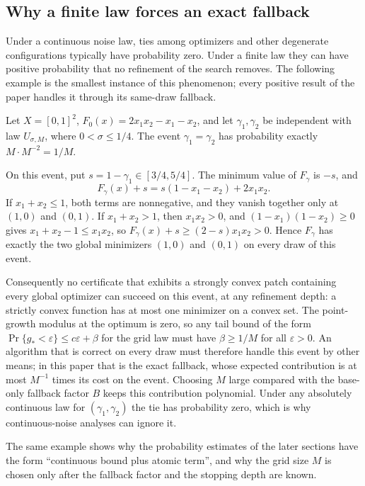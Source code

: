 \subsection{Why a finite law forces an exact fallback}\label{sec:model:atom}

Under a continuous noise law, ties among optimizers and other degenerate
configurations typically have probability zero. Under a finite law they can
have positive probability that no refinement of the search removes. The
following example is the smallest instance of this phenomenon; every
positive result of the paper handles it through its same-draw fallback.

\begin{example}\label{ex:model:tie}
Let $X=[0,1]^2$, $F_0(x)=2x_1x_2-x_1-x_2$, and let $\gamma_1,\gamma_2$ be
independent with law $U_{\sigma,M}$, where $0<\sigma\le1/4$. The event
$\gamma_1=\gamma_2$ has probability exactly $M\cdot M^{-2}=1/M$.

On this event, put $s=1-\gamma_1\in[3/4,5/4]$. The minimum value of
$F_\gamma$ is $-s$, and
\[
 F_\gamma(x)+s=s(1-x_1-x_2)+2x_1x_2 .
\]
If $x_1+x_2\le1$, both terms are nonnegative, and they vanish together only
at $(1,0)$ and $(0,1)$. If $x_1+x_2>1$, then $x_1x_2>0$, and
$(1-x_1)(1-x_2)\ge0$ gives $x_1+x_2-1\le x_1x_2$, so
$F_\gamma(x)+s\ge(2-s)x_1x_2>0$. Hence $F_\gamma$ has exactly the two
global minimizers $(1,0)$ and $(0,1)$ on every draw of this event.

Consequently no certificate that exhibits a strongly convex patch containing
every global optimizer can succeed on this event, at any refinement depth:
a strictly convex function has at most one minimizer on a convex set. The
point-growth modulus at the optimum is zero, so any tail bound of the form
$\Pr\{g_*<\varepsilon\}\le c\varepsilon+\beta$ for the grid law must have
$\beta\ge1/M$ for all $\varepsilon>0$. An algorithm that is correct on every
draw must therefore handle this event by other means; in this paper that is
the exact fallback, whose expected contribution is at most
$M^{-1}$ times its cost on the event. Choosing $M$ large compared with the
base-only fallback factor $B$ keeps this contribution polynomial. Under any
absolutely continuous law for $(\gamma_1,\gamma_2)$ the tie has probability
zero, which is why continuous-noise analyses can ignore it.
\end{example}

The same example shows why the probability estimates of the later sections
have the form ``continuous bound plus atomic term'', and why the grid size
$M$ is chosen only after the fallback factor and the stopping depth are
known.
